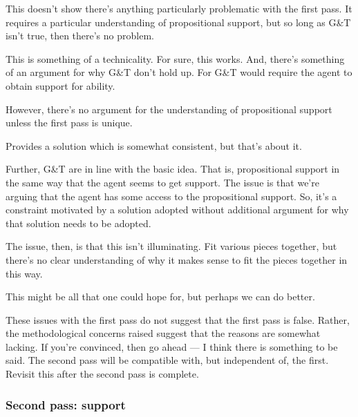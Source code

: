{
  \color{green}
  \begin{note}
    This doesn't show there's anything particularly problematic with the first pass.
    It requires a particular understanding of propositional support, but so long as G\&T isn't true, then there's no problem.

    This is something of a technicality.
    For sure, this works.
    And, there's something of an argument for why G\&T don't hold up.
    For G\&T would require the agent to obtain support for ability.

    However, there's no argument for the understanding of propositional support unless the first pass is unique.

    Provides a solution which is somewhat consistent, but that's about it.

    Further, G\&T are in line with the basic idea.
    That is, propositional support in the same way that the agent seems to get support.
    The issue is that we're arguing that the agent has some access to the propositional support.
    So, it's a constraint motivated by a solution adopted without additional argument for why that solution needs to be adopted.

    The issue, then, is that this isn't illuminating.
    Fit various pieces together, but there's no clear understanding of why it makes sense to fit the pieces together in this way.

    This might be all that one could hope for, but perhaps we can do better.
  \end{note}
}

\begin{note}[Summarising]
  These issues with the first pass do not suggest that the first pass is false.
  Rather, the methodological concerns raised suggest that the reasons are somewhat lacking.
  If you're convinced, then go ahead --- I think there is something to be said.
  The second pass will be compatible with, but independent of, the first.
  Revisit this after the second pass is complete.
\end{note}

\subsubsection{Second pass: \future{} support}
\label{sec:second-pass:-futures}

